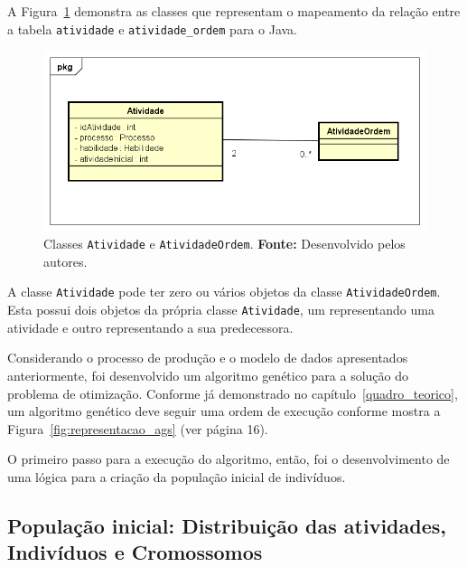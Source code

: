 \par A Figura~\ref{fig:class_atividadeOrdem} demonstra as classes que representam o mapeamento da relação
entre a tabela \texttt{atividade} e \texttt{atividade\_ordem} para o Java.

\newpage

\begin{figure}[h!]
	\centerline{\includegraphics[scale=0.7]{./imagens/atividade_diagram.png}}
	\caption[Classes \texttt{Atividade} e \texttt{AtividadeOrdem}.]
	{Classes \texttt{Atividade} e \texttt{AtividadeOrdem}. \textbf{Fonte:}
	Desenvolvido pelos autores.}
	\label{fig:class_atividadeOrdem}
\end{figure} 

\par A classe \texttt{Atividade} pode ter zero ou vários objetos da classe
\texttt{AtividadeOrdem}.
Esta possui dois objetos da própria classe \texttt{Atividade}, um representando uma
atividade e outro representando a sua predecessora.

\par Considerando o processo de produção e o modelo de dados apresentados anteriormente, foi
desenvolvido um algoritmo genético para a solução do problema de otimização. Conforme já demonstrado 
no capítulo~\ref{quadro_teorico}, um algoritmo genético deve seguir uma ordem de execução conforme mostra
a Figura~\ref{fig:representacao_ags} (ver página 16).

\par O primeiro passo para a execução do algoritmo, então, foi o desenvolvimento de uma lógica para a criação
da população inicial de indivíduos.

\subsection {População inicial: Distribuição das atividades, Indivíduos e Cromossomos} \label{populacao_inicial_section}

